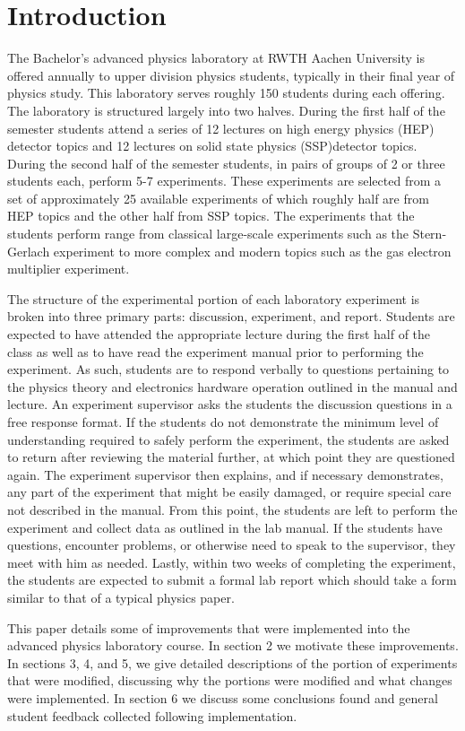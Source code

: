 \section{Introduction}
The Bachelor's advanced physics laboratory at RWTH Aachen University is offered annually to upper division physics students, typically in their final year of physics study.
This laboratory serves roughly 150 students during each offering.
The laboratory is structured largely into two halves.
During the first half of the semester students attend a series of 12 lectures on high energy physics (HEP) detector topics and 12 lectures on solid state physics (SSP)detector topics.
During the second half of the semester students, in pairs of groups of 2 or three students each, perform 5-7 experiments.
These experiments are selected from a set of approximately 25 available experiments of which roughly half are from HEP topics and the other half from SSP topics.
The experiments that the students perform range from classical large-scale experiments such as the Stern-Gerlach experiment to more complex and modern topics such as the gas electron multiplier experiment.


The structure of the experimental portion of each laboratory experiment is broken into three primary parts: discussion, experiment, and report.
Students are expected to have attended the appropriate lecture during the first half of the class as well as to have read the experiment manual prior to performing the experiment.
As such, students are to respond verbally to questions pertaining to the physics theory and electronics hardware operation outlined in the manual and lecture.
An experiment supervisor asks the students the discussion questions in a free response format.
If the students do not demonstrate the minimum level of understanding required to safely perform the experiment, the students are asked to return after reviewing the material further, at which point they are questioned again.
The experiment supervisor then explains, and if necessary demonstrates, any part of the experiment that might be easily damaged, or require special care not described in the manual.
From this point, the students are left to perform the experiment and collect data as outlined in the lab manual.
If the students have questions, encounter problems, or otherwise need to speak to the supervisor, they meet with him as needed.
Lastly, within two weeks of completing the experiment, the students are expected to submit a formal lab report which should take a form similar to that of a typical physics paper.

This paper details some of improvements that were implemented into the advanced physics laboratory course.
In section 2 we motivate these improvements.
In sections 3, 4, and 5, we give detailed descriptions of the portion of experiments that were modified, discussing why the portions were modified and what changes were implemented.
In section 6 we discuss some conclusions found and general student feedback collected following implementation.
